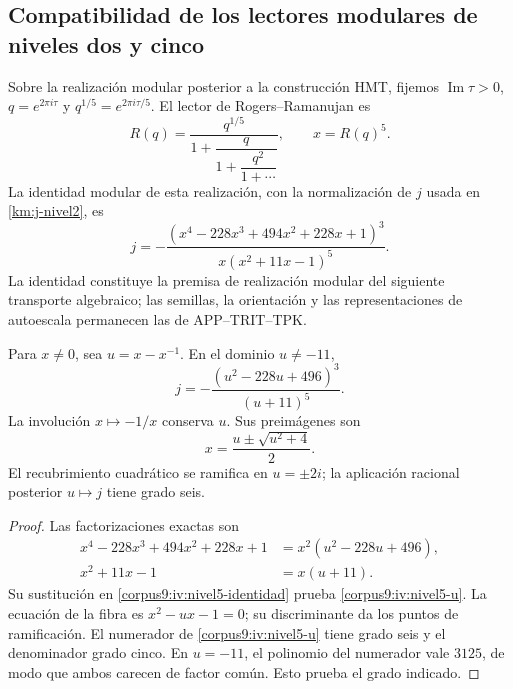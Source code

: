\subsection{Compatibilidad de los lectores modulares de niveles dos y cinco}
\label{corpus9:iv:niveles}

Sobre la realización modular posterior a la construcción HMT,
fijemos \(\operatorname{Im}\tau>0\), \(q=e^{2\pi i\tau}\) y
\(q^{1/5}=e^{2\pi i\tau/5}\). El lector de Rogers--Ramanujan es
\[
 R(q)=\frac{q^{1/5}}{1+\dfrac{q}{1+\dfrac{q^2}{1+\cdots}}},
 \qquad x=R(q)^5.
\]
La identidad modular de esta realización, con la normalización
de \(j\) usada en \eqref{km:j-nivel2}, es
\begin{equation}
 j=-\frac{(x^4-228x^3+494x^2+228x+1)^3}
          {x(x^2+11x-1)^5}.
 \label{corpus9:iv:nivel5-identidad}
\end{equation}
La identidad constituye la premisa de realización modular del
siguiente transporte algebraico; las semillas, la orientación y
las representaciones de autoescala permanecen las de APP--TRIT--TPK.

\begin{proposition}
\label{corpus9:iv:nivel5-cociente}
Para \(x\ne0\), sea \(u=x-x^{-1}\). En el dominio \(u\ne-11\),
\begin{equation}
 j=-\frac{(u^2-228u+496)^3}{(u+11)^5}.
 \label{corpus9:iv:nivel5-u}
\end{equation}
La involución \(x\mapsto-1/x\) conserva \(u\). Sus preimágenes son
\[
 x=\frac{u\pm\sqrt{u^2+4}}2.
\]
El recubrimiento cuadrático se ramifica en \(u=\pm2i\); la
aplicación racional posterior \(u\mapsto j\) tiene grado seis.
\end{proposition}
\begin{proof}
Las factorizaciones exactas son
\[
 \begin{aligned}
 x^4-228x^3+494x^2+228x+1
   &=x^2(u^2-228u+496),\\
 x^2+11x-1&=x(u+11).
 \end{aligned}
\]
Su sustitución en \eqref{corpus9:iv:nivel5-identidad} prueba
\eqref{corpus9:iv:nivel5-u}. La ecuación de la fibra es
\(x^2-ux-1=0\); su discriminante da los puntos de ramificación.
El numerador de \eqref{corpus9:iv:nivel5-u} tiene grado seis
y el denominador grado cinco. En \(u=-11\), el polinomio
del numerador vale \(3125\), de modo que ambos carecen de
factor común. Esto prueba el grado indicado.
\end{proof}

